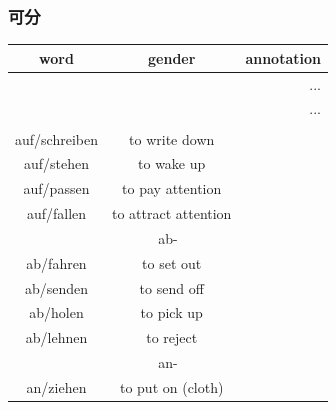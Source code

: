 \subsubsection{可分}
\begin{center}
    \begin{longtable} {|c|c|c|}
        \hline
        \rowcolor{gray}
        word            & gender                    & annotation                                  \\
        \hline
        \endfirsthead
        \multicolumn{3}{r}{...}                                                                   \\
        \hline
        \endhead
        \hline
        \multicolumn{3}{r}{...}                                                                   \\
        \endfoot
        \hline
        \endlastfoot
        \hline
        \multicolumn{3}{|c|}{auf-}                                                                \\
        \hline
        auf/schreiben   & to write down             &                                             \\
        auf/stehen      & to wake up                &                                             \\
        auf/passen      & to pay attention          &                                             \\
        auf/fallen      & to attract attention      &                                             \\
        \hline
        \multicolumn{3}{|c|}{ab-}                                                                 \\
        \hline
        ab/fahren       & to set out                &                                             \\
        ab/senden       & to send off               &                                             \\
        ab/holen        & to pick up                &                                             \\
        ab/lehnen       & to reject                 &                                             \\
        \hline
        \multicolumn{3}{|c|}{an-}                                                                 \\
        \hline
        an/ziehen       & to put on (cloth)         &                                             \\

\end{longtable}
\end{center}
